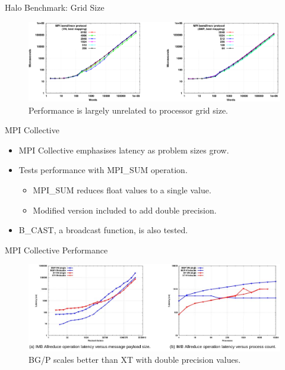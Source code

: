 \documentclass{beamer}
\begin{document}
\begin{frame}{Halo Benchmark: Grid Size}
\begin{figure}
\includegraphics[scale=0.45]{figs/halo3.png}
\caption{Performance is largely unrelated to processor grid size.}
\end{figure}
\end{frame}

\begin{frame}{MPI Collective}
\begin{itemize}
\item MPI Collective emphasises latency as problem sizes grow.
\item Tests performance with MPI\_SUM operation.
\begin{itemize}
\item MPI\_SUM reduces float values to a single value.
\item Modified version included to add double precision.
\end{itemize}
\item B\_CAST, a broadcast function, is also tested.
\end{itemize}
\end{frame}

\begin{frame}{MPI Collective Performance}
\begin{figure}
\includegraphics[scale=0.40]{figs/mpi1.png}
\caption{BG/P scales better than XT with double precision values.}
\end{figure}
\end{frame}
\end{document}
